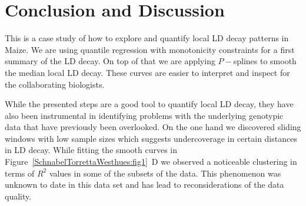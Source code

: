 \documentclass[twoside]{report}
\begin{document}

\section{Conclusion and Discussion}
This is a case study of how to explore and quantify local LD decay patterns in Maize. We are using
quantile regression with monotonicity constraints for a first summary of the LD decay. 
On top of that we are applying $P-$splines to smooth the median local LD decay. These curves 
are easier to interpret and inspect for the collaborating biologists. 

While the presented steps are a good tool to quantify local LD decay, they have also been 
	instrumental in identifying problems with the underlying genotypic data that have previously been 
	overlooked. On the one hand we discovered sliding windows with low sample sizes which suggests 
	undercoverage in certain distances in LD decay. 
	While fitting the smooth curves in Figure~\ref{SchnabelTorrettaWesthues:fig1}~D we 
	observed a noticeable clustering 
	in terms of $R^2$ values in some of the subsets of the data. This phenomenon was unknown 
	to date in this data set and has lead to reconsiderations of the data quality. 
	
\end{document}
